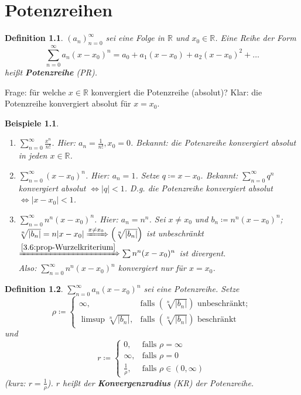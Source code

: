 \documentclass{extreport}
\newcommand{\R}{\mathbb{R}}
\theoremstyle{named}
\theoremstyle{dotless}
\newtheorem*{beispiele}{Beispiele}
\newtheorem*{definition}{Definition}
\begin{document}
\newpage


\chapter{Potenzreihen}

\begin{definition}
	$(a_{n})_{n=0}^{\infty}$ sei eine Folge in $\R$ und $x_{0} \in \R$. Eine Reihe der Form
		$$ \sum_{n=0}^{\infty} a_{n} (x - x_{0})^{n} = a_{0} + a_{1} (x - x_{0}) + a_{2} (x - x_{0})^{2} + \dotsc $$
		hei{\ss}t \textbf{Potenzreihe} (PR). 
\end{definition}

Frage: für welche $x \in \R$ konvergiert die Potenzreihe (absolut)? Klar: die Potenzreihe konvergiert absolut für $x = x_{0}$.

\begin{beispiele} ~\
	\begin{enumerate}
		\item $\sum_{n=0}^{\infty} \frac{x^{n}}{n!}$. Hier: $a_{n} = \frac{1}{n!}, x_{0} = 0$. Bekannt: die Potenzreihe konvergiert absolut in jeden $x \in \R$.
		\item $\sum_{n=0}^{\infty} (x - x_{0})^{n}$. Hier: $a_{n} = 1$. Setze $q \coloneqq x - x_{0}$. Bekannt: $\sum_{n=0}^{\infty} q^{n}$ konvergiert absolut $\iff |q| < 1$. D.g. die Potenzreihe konvergiert absolut $\iff |x - x_{0} | < 1$.
		\item $\sum_{n=0}^{\infty} n^{n} (x - x_{0})^{n}$. Hier: $a_{n} = n^{n}$. Sei $x \neq x_{0}$ und $b_{n} \coloneqq n^{n} (x - x_{0})^{n}$; $\sqrt[n]{|b_{n}|} = n |x - x_{0}| \xRightarrow[]{x \neq x_{0}} \left( \sqrt[n]{|b_{n}|} \right)$ ist unbeschränkt $\xRightarrow[]{\ref{3.6:prop-Wurzelkriterium}} \sum n^{n} (x - x_{0})^{n}$ ist divergent. \\
			Also: $\sum_{n=0}^{\infty} n^{n} (x - x_{0})^{n}$ konvergiert nur für $x = x_{0}$.
	\end{enumerate}	
\end{beispiele}

\begin{definition}
	$\sum_{n=0}^{\infty} a_{n} (x - x_{0})^{n}$ sei eine Potenzreihe. Setze
		$$ \rho \coloneqq \begin{cases}
			\infty, & \text{falls } \left( \sqrt[n]{|b_{n}|} \right) \text{ unbeschränkt}; \\
			\limsup \sqrt[n]{|b_{n}|}, & \text{falls } \left( \sqrt[n]{|b_{n}|} \right) \text{ beschränkt}
		\end{cases} $$
	und
		$$ r \coloneqq \begin{cases}
			0, & \text{falls } \rho = \infty \\
			\infty, & \text{falls } \rho = 0 \\
			\frac{1}{\rho}, & \text{falls } \rho \in (0, \infty)
		\end{cases} $$
	(kurz: \glqq $r = \frac{1}{\rho}$\grqq). $r$ hei{\ss}t der \textbf{Konvergenzradius} (KR) der Potenzreihe.
\end{definition}
\end{document}
